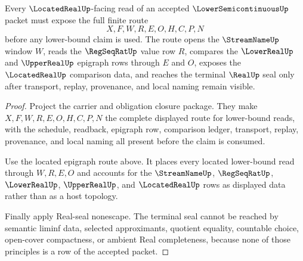 \begin{theorem}
\label{thm:lower-semicontinuous-located-real-obligation-route}
Every $\LocatedRealUp$-facing read of an accepted $\LowerSemicontinuousUp$ packet must expose the full finite route
$$
X,F,W,R,E,O,H,C,P,N
$$
before any lower-bound claim is used. The route opens the $\StreamNameUp$ window $W$, reads the $\RegSeqRatUp$ value row $R$, compares the $\LowerRealUp$ and $\UpperRealUp$ epigraph rows through $E$ and $O$, exposes the $\LocatedRealUp$ comparison data, and reaches the terminal $\RealUp$ seal only after transport, replay, provenance, and local naming remain visible.
\end{theorem}
\begin{proof}
Project the carrier and obligation closure package. They make $X,F,W,R,E,O,H,C,P,N$ the complete displayed route for lower-bound reads, with the schedule, readback, epigraph row, comparison ledger, transport, replay, provenance, and local naming all present before the claim is consumed.

Use the located epigraph route above. It places every located lower-bound read through $W,R,E,O$ and accounts for the $\StreamNameUp$, $\RegSeqRatUp$, $\LowerRealUp$, $\UpperRealUp$, and $\LocatedRealUp$ rows as displayed data rather than as a host topology.

Finally apply Real-seal nonescape. The terminal seal cannot be reached by semantic liminf data, selected approximants, quotient equality, countable choice, open-cover compactness, or ambient Real completeness, because none of those principles is a row of the accepted packet.
\end{proof}

